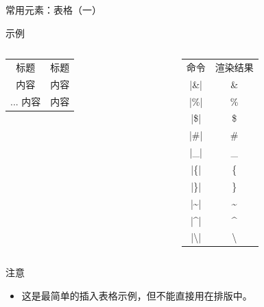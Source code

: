 \begin{frame}[fragile]{常用元素：表格（一）}
  \begin{exampleblock}{示例}
    \begin{columns}
      \begin{column}{0.5\textwidth}
        \begin{texcode}[gobble=10,emph={[1]tabular}]
          \begin{tabular}{cc}
            标题 & 标题 \\
            内容 & 内容 \\
            ...
            内容 & 内容 \\
          \end{tabular}
        \end{texcode}
      \end{column}

      \begin{column}{0.4\textwidth}
        \scriptsize
        \begin{tabular}{cc}
          命令                 & 渲染结果             \\
          |\&|               & \&               \\
          |\%|               & \%               \\
          |\$|               & \$               \\
          |\#|               & \#               \\
          |\_|               & \_               \\
          |\{|               & \{               \\
          |\}|               & \}               \\
          |\textasciitilde|  & \textasciitilde  \\
          |\textasciicircum| & \textasciicircum \\
          |\textbackslash|   & \textbackslash   \\
        \end{tabular}
      \end{column}
    \end{columns}
  \end{exampleblock}

  \begin{alertblock}{注意}
    \begin{itemize}
      \item 这是最简单的插入表格示例，但不能直接用在排版中。
    \end{itemize}
  \end{alertblock}
\end{frame}

